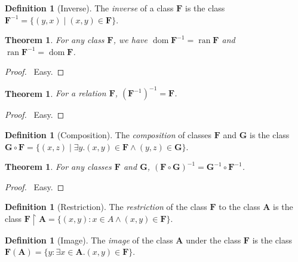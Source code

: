 \documentclass{article}
\let\qed\relax
\newtheorem{theorem}[axiom]{Theorem}
\theoremstyle{definition}
\newtheorem{definition}[axiom]{Definition}
\newcommand{\dom}{\ensuremath{\operatorname{dom}}}
\newcommand{\inv}[1]{\ensuremath{{#1}^{-1}}}
\newcommand{\ran}{\ensuremath{\operatorname{ran}}}
\begin{document}
    \begin{definition}[Inverse]
        The \emph{inverse} of a class $\mathbf{F}$ is the class $\mathbf{F}^{-1} = \{ (y,x)
        \mid (x,y) \in \mathbf{F} \}$.
    \end{definition}

    \begin{theorem}
        For any class $\mathbf{F}$, we have $\dom \mathbf{F}^{-1} = \ran \mathbf{F}$
        and $\ran \mathbf{F}^{-1} = \dom \mathbf{F}$.
    \end{theorem}

    \begin{proof}
        \pf\ Easy. \qed
    \end{proof}

    \begin{theorem}
        For a relation $\mathbf{F}$, $(\mathbf{F}^{-1})^{-1} = \mathbf{F}$.
    \end{theorem}

    \begin{proof}
        \pf\ Easy. \qed
    \end{proof}

    \begin{definition}[Composition]
        The \emph{composition} of classes $\mathbf{F}$ and $\mathbf{G}$ is the class
        $\mathbf{G} \circ \mathbf{F} = \{ (x,z) \mid \exists y. (x,y) \in \mathbf{F} \wedge (y,z) \in \mathbf{G} \}$.
    \end{definition}

    \begin{theorem}
        For any classes $\mathbf{F}$ and $\mathbf{G}$, $\inv{(\mathbf{F} \circ \mathbf{G})} =
        \inv{\mathbf{G}} \circ \inv{\mathbf{F}}$.
    \end{theorem}

    \begin{proof}
        \pf\ Easy. \qed
    \end{proof}

    \begin{definition}[Restriction]
        The \emph{restriction} of the class $\mathbf{F}$ to the class $\mathbf{A}$ is the class
        $\mathbf{F} \restriction \mathbf{A} = \{ (x,y) : x \in A \wedge (x,y) \in \mathbf{F} \}$.
    \end{definition}

    \begin{definition}[Image]
        The \emph{image} of the class $\mathbf{A}$ under the class $\mathbf{F}$ is the class
        $\mathbf{F}(\mathbf{A}) = \{ y : \exists x \in \mathbf{A}. (x,y) \in \mathbf{F} \}$.
    \end{definition}
    
\end{document}

